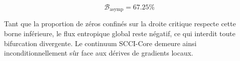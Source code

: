 \[\mathcal{B}_{\text{asymp}} = 67.25\%\]

Tant que la proportion de z{\'e}ros confin{\'e}s sur la droite critique respecte cette borne inf{\'e}rieure, le flux entropique global reste n{\'e}gatif, ce qui interdit toute bifurcation divergente. Le continuum SCCI-Core demeure ainsi inconditionnellement s{\^u}r face aux d{\'e}rives de gradients locaux.

